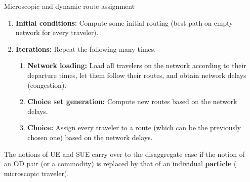 \begin{algorithm}[H]
\label{dynamic-micro-routes}

\caption{Microscopic and dynamic route assignment}

\begin{enumerate}

\item \textbf{Initial conditions:} Compute some initial routing (\eg best path on empty network
  for every traveler).

\item \textbf{Iterations:} Repeat the following many times.

\begin{enumerate}

\item \textbf{Network loading:} Load all travelers on the network
  according to their departure times, let them follow their
  routes, and obtain network delays (congestion).

\item \textbf{Choice set generation:} Compute new routes based on the
  network delays.

\item \textbf{Choice:} Assign every traveler to a route 
  (which can be the previously chosen one) based on the network delays.

\end{enumerate} %

\end{enumerate}

\end{algorithm}

The notions of UE and SUE carry over to the disaggregate case if the notion of an OD pair (or a commodity) is replaced by that of an individual \textbf{particle} ($=$ microscopic traveler).

